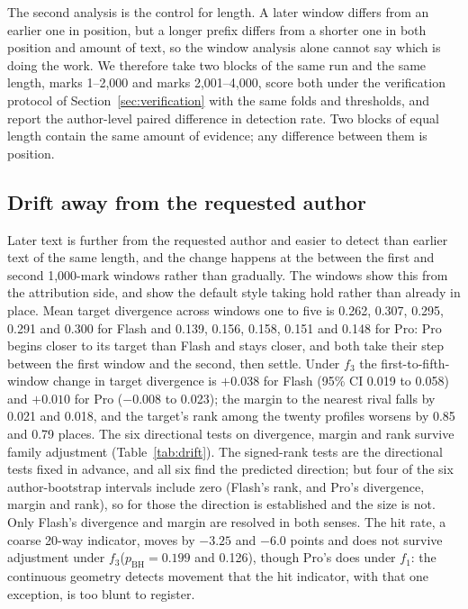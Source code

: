 \documentclass[11pt]{article}
\newcommand{\fOne}{\ensuremath{f_1}\xspace}
\newcommand{\fThree}{\ensuremath{f_3}\xspace}
\begin{document}
The second analysis is the control for length.  A later window differs
from an earlier one in position, but a longer prefix differs from a
shorter one in both position and amount of text, so the window analysis
alone cannot say which is doing the work.  We therefore take two blocks
of the same run and the same length, marks 1--2,000 and marks
2,001--4,000, score both under the verification protocol of
Section~\ref{sec:verification} with the same folds and thresholds, and
report the author-level paired difference in detection rate.  Two blocks
of equal length contain the same amount of evidence; any difference
between them is position.

\subsection{Drift away from the requested author}

Later text is further from the requested author and easier to detect
than earlier text of the same length, and the change happens at the
between the first and second 1,000-mark windows rather than gradually.
The windows show this from
the attribution side, and show the default style taking hold rather
than already in place.  Mean target
divergence across windows one to five is 0.262, 0.307, 0.295,
0.291 and 0.300 for Flash and 0.139, 0.156, 0.158, 0.151 and 0.148 for
Pro: Pro begins closer to its target than Flash and stays closer, and
both take their step between the first window and the second, then
settle.  Under \fThree the
first-to-fifth-window change in target divergence is \(+0.038\) for Flash
(95\% CI 0.019 to 0.058) and \(+0.010\) for Pro (\(-0.008\) to 0.023);
the margin to the nearest rival falls by 0.021 and 0.018, and the
target's rank among the twenty profiles worsens by 0.85 and 0.79 places.
The six directional tests on divergence, margin and rank survive family
adjustment (Table~\ref{tab:drift}).  The signed-rank tests are the
directional tests fixed in advance, and all six find the predicted
direction; but four of the six author-bootstrap intervals include zero
(Flash's rank, and Pro's divergence, margin and rank), so for those the
direction is established and the size is not.  Only Flash's divergence
and margin are resolved in both senses.  The hit rate, a coarse 20-way
indicator, moves by \(-3.25\) and \(-6.0\) points and does not survive
adjustment under \fThree (\(p_{\mathrm{BH}} = 0.199\) and 0.126), though
Pro's does under \fOne: the continuous geometry detects movement that
the hit indicator, with that one exception, is too blunt to register.
\end{document}
